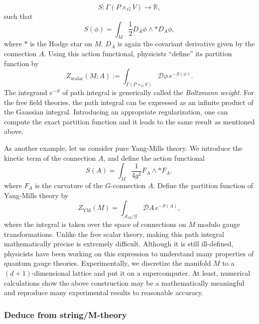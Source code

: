 \begin{equation}
  S  :  \Gamma(P\times_{G}V)  \longrightarrow  \mathbb{R},
\end{equation}
such that
\begin{equation}
  S(\phi)  =  \int_{M}\frac{1}{2}D_{A}\phi\wedge\ast D_{A}\phi,
\end{equation}
where $*$ is the Hodge star on $M$. $D_{A}$ is again the covariant
derivative given by the connection $A$. Using this action functional,
physicists ``define'' its partition function by
\begin{equation}
Z_{\mathrm{scalar}}(M;A):=\int_{\Gamma(P\times_{G}V)}\mathcal{D}\phi\,e^{-S(\phi)}.
\end{equation}
The integrand $e^{-S}$ of path integral is generically called the
\emph{Boltzmann weight}. For the free field theories, the path integral
can be expressed as an infinite product of the Gaussian integral.
Introducing an appropriate regularization, one can compute the exact
partition function and it leads to the same result as mentioned above.

As another example, let us consider pure Yang-Mills theory. We introduce
the kinetic term of the connection $A$, and define the action functional
\begin{equation}
  S(A)  =  \int_{M}\frac{1}{4g^{2}}F_{A}\wedge*F_{A},
\end{equation}
where $F_{A}$ is the curvature of the $G$-connection $A$. Define
the partition function of Yang-Mills theory by
\begin{equation}
  Z_{\mathrm{YM}}(M)  =  \int_{\mathcal{A}_{M}/\mathcal{G}}\mathcal{D}A\,e^{-S(A)},
\end{equation}
where the integral is taken over the space of connections on $M$
modulo gauge transformations. Unlike the free scalar theory, making
this path integral mathematically precise is extremely difficult.
Although it is still ill-defined, physicists have been working
on this expression to understand many properties of quantum gauge
theories. Experimentally, we discretize the manifold $M$
to a $(d+1)$-dimensional lattice and put it on a supercomputer. At
least, numerical calculations show the above construction may be a
mathematically meaningful and reproduce many experimental results
to reasonable accuracy.

\subsubsection*{Deduce from string/M-theory}

